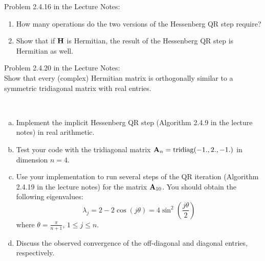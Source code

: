 
\begin{Sheet}
  \label{sheet5}

  \begin{Problem}
  	Problem 2.4.16 in the Lecture Notes:
  	\begin{enumerate}
  		\item How many operations do the two versions of the Hessenberg QR step require?
  		\item Show that if $\mathbf H$ is Hermitian, the result of the
  		Hessenberg QR step is Hermitian as well.
  	\end{enumerate}
  \end{Problem}

  \begin{Problem}
	Problem 2.4.20 in the Lecture Notes:\\
	Show that every (complex) Hermitian matrix is orthogonally similar
	to a symmetric tridiagonal matrix with real entries.
  \end{Problem}

\begin{Problem}
	\hfill\\\vspace{-6ex}
	\begin{enumerate}[(a)]
		\item Implement the implicit Hessenberg QR step (Algorithm 2.4.9 in the
		lecture notes) in real arithmetic.
		\item Test your code with the tridiagonal matrix
		$\mathbf A_n=\operatorname{tridiag}(-1.,2.,-1.)$ in dimension $n=4$.
		\item Use your implementation to run several steps of the QR
		iteration (Algorithm 2.4.19 in the lecture notes) for the matrix
		$\mathbf A_{10}$.
		You should obtain the following eigenvalues:
		\begin{equation*}
		\lambda_j = 2 - 2\cos(j\theta) = 4\sin^2\left(\frac{j\theta}{2}\right)
		\end{equation*}
		where $\theta = \frac{\pi}{n+1}$, $1 \leq j \leq n$.
		\item Discuss the observed convergence of the off-diagonal and
		diagonal entries, respectively.
	\end{enumerate}
\end{Problem}


\end{Sheet}
